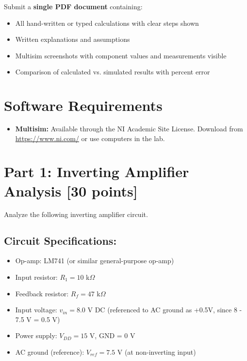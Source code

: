 \documentclass[11pt]{article}
\begin{document}
Submit a \textbf{single PDF document} containing:

\begin{itemize}
    \item All hand-written or typed calculations with clear steps shown
    \item Written explanations and assumptions
    \item Multisim screenshots with component values and measurements visible
    \item Comparison of calculated vs. simulated results with percent error
\end{itemize}

\vspace{0.3cm}

\section*{Software Requirements}

\begin{itemize}
    \item \textbf{Multisim:} Available through the NI Academic Site License. Download from \url{https://www.ni.com/} or use computers in the lab.
\end{itemize}

\newpage

\section*{Part 1: Inverting Amplifier Analysis [30 points]}

Analyze the following inverting amplifier circuit.

\subsection*{Circuit Specifications:}

\begin{itemize}
    \item Op-amp: LM741 (or similar general-purpose op-amp)
    \item Input resistor: $R_1 = 10$ k$\Omega$
    \item Feedback resistor: $R_f = 47$ k$\Omega$
    \item Input voltage: $v_{in} = 8.0$ V DC (referenced to AC ground as +0.5V, since 8 - 7.5 V = 0.5 V)
    \item Power supply: $V_{DD} = 15$ V, GND = 0 V
    \item AC ground (reference): $V_{ref} = 7.5$ V (at non-inverting input)
\end{itemize}
\end{document}
